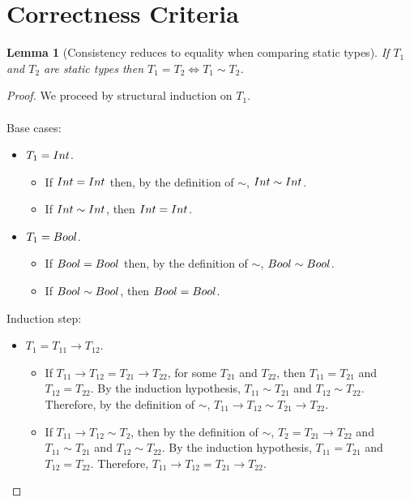 \documentclass[a4paper]{article}
\newtheorem{lemma}{Lemma}[section]
\begin{document}
\section{Correctness Criteria}
\begin{lemma}[Consistency reduces to equality when comparing static types]
\label{consistencytoequality}
If $T_1$ and $T_2$ are static types then $T_1 = T_2 \iff T_1 \sim T_2$.
\end{lemma}
\begin{proof}
We proceed by structural induction on $T_1$.\\\\
Base cases:
\begin{itemize}
    \item $T_1 = {Int}$.
    \begin{itemize}
        \item If ${Int} = {Int}$ then, by the definition of $\sim$, ${Int} \sim {\ensuremath{Int}}$.
        \item If ${Int} \sim {\ensuremath{Int}}$, then ${Int} = {Int}$.
    \end{itemize}
    \item $T_1 = Bool$.
    \begin{itemize}
        \item If $Bool = Bool$ then, by the definition of $\sim$, $Bool \sim Bool$.
        \item If $Bool \sim Bool$, then $Bool = Bool$.
    \end{itemize}
\end{itemize}
Induction step:
\begin{itemize}
    \item $T_1 = T_{11} \rightarrow T_{12}$.
    \begin{itemize}
        \item If $T_{11} \rightarrow T_{12} = T_{21} \rightarrow T_{22}$, for some $T_{21}$ and $T_{22}$, then $T_{11} = T_{21}$ and $T_{12} = T_{22}$.
        By the induction hypothesis, $T_{11} \sim T_{21}$ and $T_{12} \sim T_{22}$.
        Therefore, by the definition of $\sim$, $T_{11} \rightarrow T_{12} \sim T_{21} \rightarrow T_{22}$.
        \item If $T_{11} \rightarrow T_{12} \sim T_2$, then by the definition of $\sim$, $T_2 = T_{21} \rightarrow T_{22}$ and $T_{11} \sim T_{21}$ and $T_{12} \sim T_{22}$.
        By the induction hypothesis, $T_{11} = T_{21}$ and $T_{12} = T_{22}$.
        Therefore, $T_{11} \rightarrow T_{12} = T_{21} \rightarrow T_{22}$.
    \end{itemize}

\end{itemize}
\end{proof}
\end{document}
